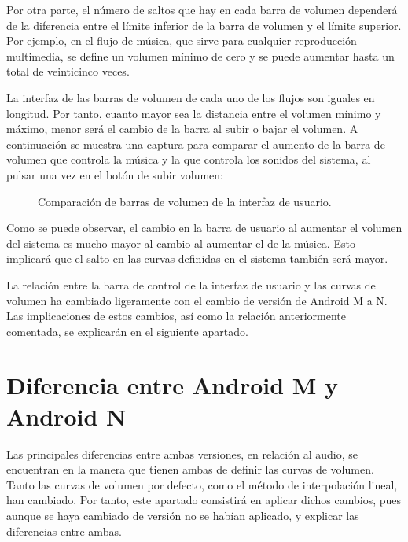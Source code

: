 Por otra parte, el número de saltos que hay en cada barra de volumen dependerá de la diferencia entre el límite inferior de la barra de volumen y el límite superior. Por ejemplo, en el flujo de música, que sirve para cualquier reproducción multimedia, se define un volumen mínimo de cero y se puede aumentar hasta un total de veinticinco veces.

La interfaz de las barras de volumen de cada uno de los flujos son iguales en longitud. Por tanto, cuanto mayor sea la distancia entre el volumen mínimo y máximo, menor será el cambio de la barra al subir o bajar el volumen. A continuación se muestra una captura para comparar el aumento de la barra de volumen que controla la música y la que controla los sonidos del sistema, al pulsar una vez en el botón de subir volumen:

\begin{figure}[H]
	\centering
	\break
	\caption{Comparación de barras de volumen de la interfaz de usuario.} \label{fig:volume_compare_ui}
\end{figure}

Como se puede observar, el cambio en la barra de usuario al aumentar el volumen del sistema es mucho mayor al cambio al aumentar el de la música. Esto implicará que el salto en las curvas definidas en el sistema también será mayor.

La relación entre la barra de control de la interfaz de usuario y las curvas de volumen ha cambiado ligeramente con el cambio de versión de Android M a N. Las implicaciones de estos cambios, así como la relación anteriormente comentada, se explicarán en el siguiente apartado.

\section{Diferencia entre Android M y Android N}
Las principales diferencias entre ambas versiones, en relación al audio, se encuentran en la manera que tienen ambas de definir las curvas de volumen. Tanto las curvas de volumen por defecto, como el método de interpolación lineal, han cambiado. Por tanto, este apartado consistirá en aplicar dichos cambios, pues aunque se haya cambiado de versión no se habían aplicado, y explicar las diferencias entre ambas.

